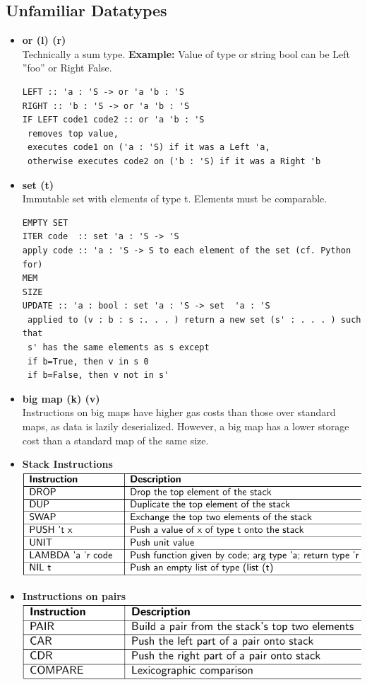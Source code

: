 \documentclass{article}
\begin{document}
\subsection{Unfamiliar Datatypes}
\begin{itemize}
\item \textbf{or (l) (r)}\\
Technically a sum type. \textbf{Example:} Value of type or string bool can be Left ”foo” or Right False.
\begin{lstlisting}
LEFT :: 'a : 'S -> or 'a 'b : 'S
RIGHT :: 'b : 'S -> or 'a 'b : 'S
IF LEFT code1 code2 :: or 'a 'b : 'S
 removes top value,
 executes code1 on ('a : 'S) if it was a Left 'a,
 otherwise executes code2 on ('b : 'S) if it was a Right 'b
\end{lstlisting}
\item \textbf{set (t)}\\
Immutable set with elements of type t. Elements must be comparable.
\begin{lstlisting}
EMPTY SET
ITER code  :: set 'a : 'S -> 'S
apply code :: 'a : 'S -> S to each element of the set (cf. Python for)
MEM
SIZE
UPDATE :: 'a : bool : set 'a : 'S -> set  'a : 'S
 applied to (v : b : s :. . . ) return a new set (s' : . . . ) such that
 s' has the same elements as s except
 if b=True, then v in s 0
 if b=False, then v not in s'
\end{lstlisting}
\item \textbf{big map (k) (v)}\\
Instructions on big maps have higher gas costs than those over standard maps, as data is lazily deserialized. However, a big map has a lower storage cost than a standard map of the same size.
\item \textbf{Stack Instructions}\\
\includegraphics[scale=0.4]{73.png}
\item \textbf{Instructions on pairs}\\
\includegraphics[scale=0.4]{74.png}

\end{itemize}
\end{document}
